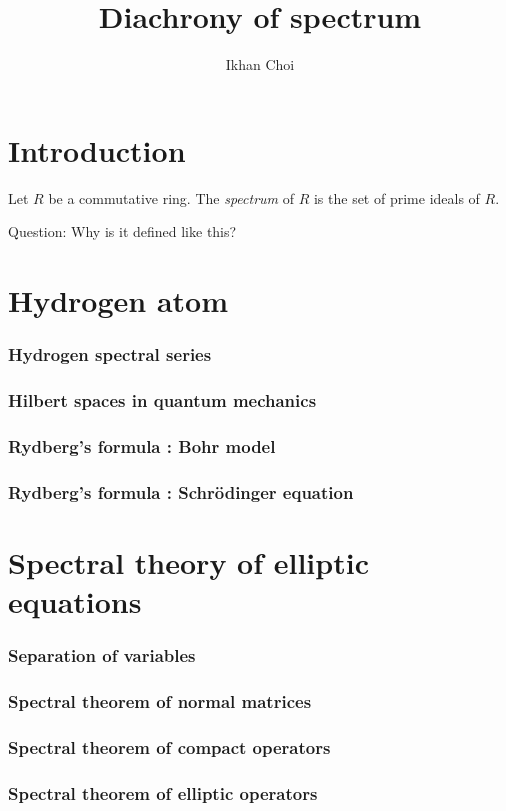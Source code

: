 \documentclass{beamer}
\title{Diachrony of spectrum}
\author{Ikhan Choi}
\begin{document}
\maketitle

\section{Introduction}
\begin{frame}
\begin{defn}
	Let $R$ be a commutative ring.
	The \emph{spectrum} of $R$ is the set of prime ideals of $R$.
\end{defn}
\pause Question: Why is it defined like this?
\end{frame}


\section{Hydrogen atom}
\begin{frame}
\frametitle{Hydrogen spectral series}
\end{frame}
\begin{frame}
\frametitle{Hilbert spaces in quantum mechanics}
\end{frame}
\begin{frame}
\frametitle{Rydberg's formula : Bohr model}
\end{frame}
\begin{frame}
\frametitle{Rydberg's formula : Schr\"odinger equation}
\end{frame}


\section{Spectral theory of elliptic equations}
\begin{frame}
\frametitle{Separation of variables}
\end{frame}
\begin{frame}
\frametitle{Spectral theorem of normal matrices}
\end{frame}
\begin{frame}
\frametitle{Spectral theorem of compact operators}
\end{frame}
\begin{frame}
\frametitle{Spectral theorem of elliptic operators}
\end{frame}
\end{document}
